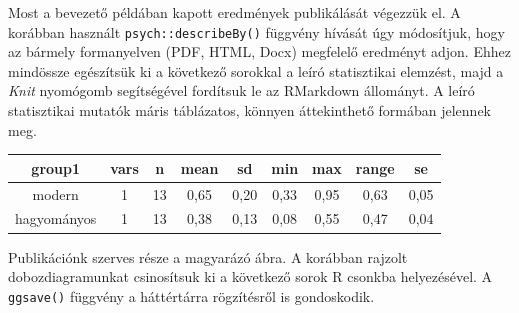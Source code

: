 \documentclass[
]{book}
\newenvironment{Shaded}{\begin{snugshade}}{\end{snugshade}}
\newcommand{\AttributeTok}[1]{\textcolor[rgb]{0.77,0.63,0.00}{#1}}
\newcommand{\CommentTok}[1]{\textcolor[rgb]{0.56,0.35,0.01}{\textit{#1}}}
\newcommand{\DecValTok}[1]{\textcolor[rgb]{0.00,0.00,0.81}{#1}}
\newcommand{\FunctionTok}[1]{\textcolor[rgb]{0.00,0.00,0.00}{#1}}
\newcommand{\NormalTok}[1]{#1}
\newcommand{\OtherTok}[1]{\textcolor[rgb]{0.56,0.35,0.01}{#1}}
\newcommand{\SpecialCharTok}[1]{\textcolor[rgb]{0.00,0.00,0.00}{#1}}
\newcommand{\StringTok}[1]{\textcolor[rgb]{0.31,0.60,0.02}{#1}}
\begin{document}
Most a bevezető példában kapott eredmények publikálását végezzük el. A korábban használt \texttt{psych::describeBy()} függvény hívását úgy módosítjuk, hogy az bármely formanyelven (PDF, HTML, Docx) megfelelő eredményt adjon. Ehhez mindössze egészítsük ki a következő sorokkal a leíró statisztikai elemzést, majd a \emph{Knit} nyomógomb segítségével fordítsuk le az RMarkdown állományt. A leíró statisztikai mutatók máris táblázatos, könnyen áttekinthető formában jelennek meg.

\begin{Shaded}
\end{Shaded}

\begin{tabular}{c|c|c|c|c|c|c|c|c}
\hline
group1 & vars & n & mean & sd & min & max & range & se\\
\hline
modern & 1 & 13 & 0,65 & 0,20 & 0,33 & 0,95 & 0,63 & 0,05\\
\hline
hagyományos & 1 & 13 & 0,38 & 0,13 & 0,08 & 0,55 & 0,47 & 0,04\\
\hline
\end{tabular}

Publikációnk szerves része a magyarázó ábra. A korábban rajzolt dobozdiagramunkat csinosítsuk ki a következő sorok R csonkba helyezésével. A \texttt{ggsave()} függvény a háttértárra rögzítésről is gondoskodik.
\end{document}
